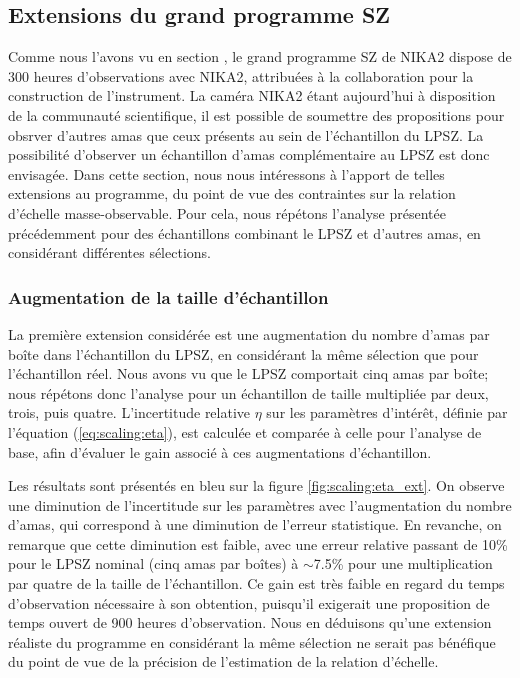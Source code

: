 \subsection{Extensions du grand programme SZ}

Comme nous l'avons vu en section , le grand programme SZ de NIKA2 dispose de 300 heures d'observations avec NIKA2, attribuées à la collaboration pour la construction de l'instrument.
La caméra NIKA2 étant aujourd'hui à disposition de la communauté scientifique, il est possible de soumettre des propositions pour obsrver d'autres amas que ceux présents au sein de l'échantillon du LPSZ.
La possibilité d'observer un échantillon d'amas complémentaire au LPSZ est donc envisagée.
Dans cette section, nous nous intéressons à l'apport de telles extensions au programme, du point de vue des contraintes sur la relation d'échelle masse-observable.
Pour cela, nous répétons l'analyse présentée précédemment pour des échantillons combinant le LPSZ et d'autres amas, en considérant différentes sélections.

\subsubsection{Augmentation de la taille d'échantillon} %

La première extension considérée est une augmentation du nombre d'amas par boîte dans l'échantillon du LPSZ, en considérant la même sélection que pour l'échantillon réel.
Nous avons vu que le LPSZ comportait cinq amas par boîte; nous répétons donc l'analyse pour un échantillon de taille multipliée par deux, trois, puis quatre.
L'incertitude relative $\eta$ sur les paramètres d'intérêt, définie par l'équation (\ref{eq:scaling:eta}), est calculée et comparée à celle pour l'analyse de base, afin d'évaluer le gain associé à ces augmentations d'échantillon.

Les résultats sont présentés en bleu sur la figure \ref{fig:scaling:eta_ext}.
On observe une diminution de l'incertitude sur les paramètres avec l'augmentation du nombre d'amas, qui correspond à une diminution de l'erreur statistique.
En revanche, on remarque que cette diminution est faible, avec une erreur relative passant de 10\% pour le LPSZ nominal (cinq amas par boîtes) à $\sim$7.5\% pour une multiplication par quatre de la taille de l'échantillon.
Ce gain est très faible en regard du temps d'observation nécessaire à son obtention, puisqu'il exigerait une proposition de temps ouvert de 900 heures d'observation.
Nous en déduisons qu'une extension réaliste du programme en considérant la même sélection ne serait pas bénéfique du point de vue de la précision de l'estimation de la relation d'échelle.

